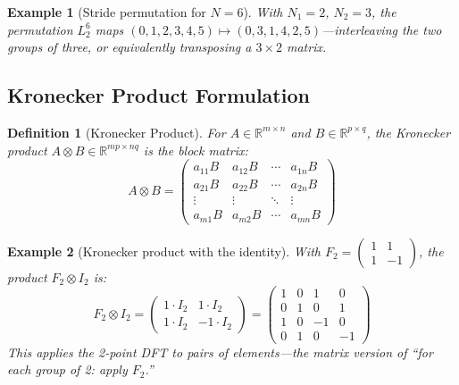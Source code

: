 \documentclass[12pt,a4paper]{report}
\theoremstyle{thms}
\theoremstyle{defns}
\newtheorem{definition}{Definition}[section]
\newtheorem{example}{Example}[section]
\begin{document}
\begin{example}[Stride permutation for $N = 6$]
    With $N_1 = 2$, $N_2 = 3$, the permutation $L_2^6$ maps $(0,1,2,3,4,5) \mapsto (0,3,1,4,2,5)$—interleaving the two groups of three, or equivalently transposing a $3 \times 2$ matrix.
\end{example}

\subsection{Kronecker Product Formulation}

\begin{definition}[Kronecker Product]
    For $A \in \mathbb{R}^{m \times n}$ and $B \in \mathbb{R}^{p \times q}$, the Kronecker product $A \otimes B \in \mathbb{R}^{mp \times nq}$ is the block matrix:
    \begin{equation}
        A \otimes B = \begin{pmatrix} a_{11}B & a_{12}B & \cdots & a_{1n}B \\ a_{21}B & a_{22}B & \cdots & a_{2n}B \\ \vdots & \vdots & \ddots & \vdots \\ a_{m1}B & a_{m2}B & \cdots & a_{mn}B \end{pmatrix}
    \end{equation}
\end{definition}

\begin{example}[Kronecker product with the identity]
    With $F_2 = \begin{pmatrix} 1 & 1 \\ 1 & -1 \end{pmatrix}$, the product $F_2 \otimes I_2$ is:
    \begin{equation}
        F_2 \otimes I_2 = \begin{pmatrix} 1 \cdot I_2 & 1 \cdot I_2 \\ 1 \cdot I_2 & -1 \cdot I_2 \end{pmatrix} = \begin{pmatrix} 1 & 0 & 1 & 0 \\ 0 & 1 & 0 & 1 \\ 1 & 0 & -1 & 0 \\ 0 & 1 & 0 & -1 \end{pmatrix}
    \end{equation}
    This applies the 2-point DFT to pairs of elements—the matrix version of ``for each group of 2: apply $F_2$.''
\end{example}
\end{document}
